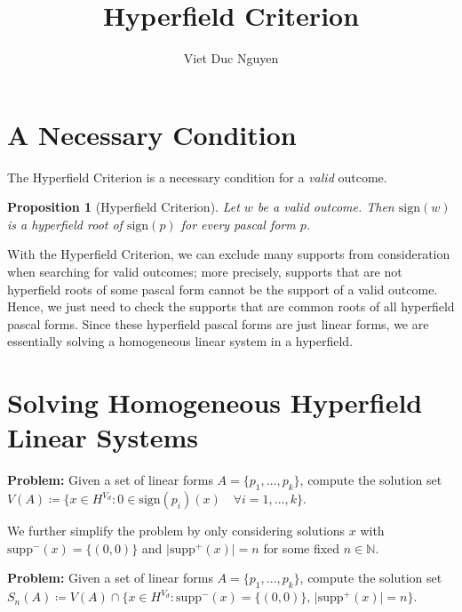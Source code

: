 \documentclass[11pt]{article}
\newtheorem{proposition}[theorem]{Proposition}
\begin{document}
\author{Viet Duc Nguyen}
\title{Hyperfield Criterion}
\maketitle

\section{A Necessary Condition}
The Hyperfield Criterion is a necessary condition for a \emph{valid} outcome.

\begin{proposition}[Hyperfield Criterion]
 Let $w$ be a valid outcome. Then $\mathrm{sign}(w)$ is a hyperfield root of $\mathrm{sign}(p)$ for every pascal form $p$.
\end{proposition}

With the Hyperfield Criterion, we can exclude many supports from consideration when searching for valid outcomes; more precisely, supports that are not hyperfield roots of some pascal form cannot be the support of a valid outcome. Hence, we just need to check the supports that are common roots of all hyperfield pascal forms. Since these hyperfield pascal forms are just linear forms, we are essentially solving a homogeneous linear system in a hyperfield.


\section{Solving Homogeneous Hyperfield Linear Systems}

\textbf{Problem:} Given a set of linear forms $A = \{ p_{1}, \dots, p_{k} \}$, compute the solution set $V(A) \coloneqq \{ x \in H^{V_{d}} : 0 \in \mathrm{sign}(p_{i})(x)  \quad \forall i = 1, \dots, k \}$.

\vspace{0.3cm}

We further simplify the problem by only considering solutions $x$ with $\mathrm{supp}^-(x) = \{ (0,0) \}$ and $\vert \mathrm{supp}^+(x) \vert = n$ for some fixed $n \in \mathbb N$.

\vspace{0.3cm}

\noindent \textbf{Problem:} Given a set of linear forms $A = \{ p_{1}, \dots, p_{k} \}$, compute the solution set $S_{n}(A) \coloneqq V(A) \cap \{ x \in H^{V_{d}} : \text{$\mathrm{supp}^-(x) = \{ (0,0) \}$, $\vert \mathrm{supp}^+(x) \vert = n$} \}$.

\vspace{0.3cm}
\end{document}
